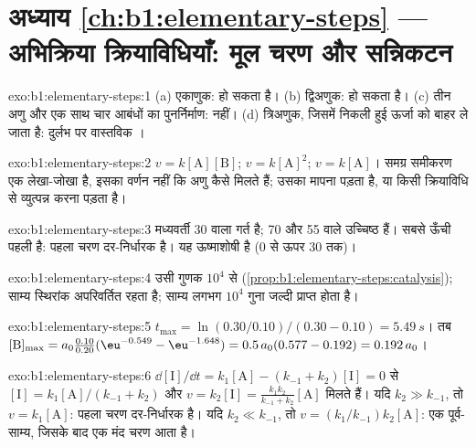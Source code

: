 \section*{अध्याय \ref{ch:b1:elementary-steps} --- अभिक्रिया क्रियाविधियाँ: मूल चरण और सन्निकटन}

\begin{solution}{exo:b1:elementary-steps:1}
(a) एकाणुक:  हो सकता है। (b) द्विअणुक:  हो सकता है।
(c) तीन अणु और एक साथ चार आबंधों का पुनर्निर्माण:  नहीं।
(d) त्रिअणुक, जिसमें  निकली हुई ऊर्जा को बाहर ले जाता है: दुर्लभ पर
वास्तविक ।
\end{solution}

\begin{solution}{exo:b1:elementary-steps:2}
$v = k[\mathrm{A}][\mathrm{B}]$; $v = k[\mathrm{A}]^2$; $v = k[\mathrm{A}]$।
समग्र समीकरण एक लेखा-जोखा है, इसका वर्णन नहीं कि
अणु कैसे मिलते हैं; उसका  मापना पड़ता है, या किसी
क्रियाविधि से व्युत्पन्न करना पड़ता है।
\end{solution}

\begin{solution}{exo:b1:elementary-steps:3}
मध्यवर्ती 30 वाला गर्त है;  70 और 55 वाले
उच्चिष्ठ हैं। सबसे ऊँची  पहली है: पहला
चरण दर-निर्धारक है। यह ऊष्माशोषी है (0 से ऊपर 30 तक)।
\end{solution}

\begin{solution}{exo:b1:elementary-steps:4}
उसी गुणक $10^4$ से (\cref{prop:b1:elementary-steps:catalysis}); साम्य
स्थिरांक अपरिवर्तित रहता है; साम्य लगभग $10^4$
गुना जल्दी प्राप्त होता है।
\end{solution}

\begin{solution}{exo:b1:elementary-steps:5}
$t_{\max} = \ln(0.30/0.10)/(0.30 - 0.10) = \qty{5.49}{s}$। तब
$[\mathrm{B}]_{\max} = a_0\frac{0.10}{0.20}(\eu^{-0.549} - \eu^{-1.648}) =
0.5\,a_0(0.577 - 0.192) = 0.192\,a_0$।
\end{solution}

\begin{solution}{exo:b1:elementary-steps:6}
$\dd[\mathrm{I}]/\dd t = k_1[\mathrm{A}] - (k_{-1} + k_2)[\mathrm{I}] = 0$
से $[\mathrm{I}] = k_1[\mathrm{A}]/(k_{-1} + k_2)$ और $v = k_2[\mathrm{I}]
= \frac{k_1k_2}{k_{-1}+k_2}[\mathrm{A}]$ मिलते हैं। यदि $k_2 \gg k_{-1}$, तो $v =
k_1[\mathrm{A}]$: पहला चरण दर-निर्धारक है। यदि $k_2 \ll k_{-1}$, तो
$v = (k_1/k_{-1})k_2[\mathrm{A}]$: एक पूर्व-साम्य, जिसके बाद एक मंद
चरण आता है।
\end{solution}


